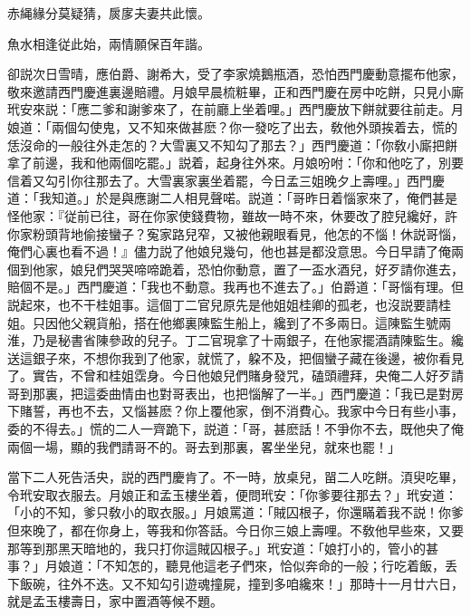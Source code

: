 \begin{myquote}
赤䋲緣分莫疑猜，扊扅夫妻共此懷。

魚水相逢従此始，兩情願保百年諧。
\end{myquote}

卻説次日雪晴，應伯爵、謝希大，受了李家燒鵝瓶酒，恐怕西門慶動意擺布他家，敬來邀請西門慶進裏邊賠禮。月娘早晨梳粧畢，正和西門慶在房中吃餅，只見小廝玳安來説：「應二爹和謝爹來了，在前廳上坐着哩。」西門慶放下餅就要往前走。月娘道：「兩個勾使鬼，又不知來做甚麽？你一發吃了出去，敎他外頭挨着去，慌的恁沒命的一般往外走怎的？大雪裏又不知勾了那去？」西門慶道：「你敎小廝把餅拿了前邊，我和他兩個吃罷。」説着，起身往外來。月娘吩咐：「你和他吃了，別要信着又勾引你往那去了。大雪裏家裏坐着罷，今日孟三姐晚夕上壽哩。」西門慶道：「我知道。」於是與應謝二人相見聲喏。説道：「哥昨日着惱家來了，俺們甚是怪他家：『従前已往，哥在你家使錢費物，雖故一時不來，休要改了腔兒纔好，許你家粉頭背地偷接蠻子？寃家路兒窄，又被他親眼看見，他怎的不惱！休説哥惱，俺們心裏也看不過！』儘力説了他娘兒幾句，他也甚是都没意思。今日早請了俺兩個到他家，娘兒們哭哭啼啼跪着，恐怕你動意，置了一盃水酒兒，好歹請你進去，賠個不是。」西門慶道：「我也不動意。我再也不進去了。」伯爵道：「哥惱有理。但説起來，也不干桂姐事。這個丁二官兒原先是他姐姐桂卿的孤老，也沒説要請桂姐。只因他父親貨船，搭在他鄉裏陳監生船上，纔到了不多兩日。這陳監生號兩淮，乃是秘書省陳參政的兒子。丁二官現拿了十兩銀子，在他家擺酒請陳監生。纔送這銀子來，不想你我到了他家，就慌了，躱不及，把個蠻子藏在後邊，被你看見了。實告，不曾和桂姐霑身。今日他娘兒們賭身發咒，磕頭禮拜，央俺二人好歹請哥到那裏，把這委曲情由也對哥表出，也把惱解了一半。」西門慶道：「我已是對房下賭誓，再也不去，又惱甚麽？你上覆他家，倒不消費心。我家中今日有些小事，委的不得去。」慌的二人一齊跪下，説道：「哥，甚麽話！不爭你不去，既他央了俺兩個一場，顯的我們請哥不的。哥去到那裏，畧坐坐兒，就來也罷！」

當下二人死告活央，説的西門慶肯了。不一時，放桌兒，㽞二人吃餅。湏臾吃畢，令玳安取衣服去。月娘正和孟玉樓坐着，便問玳安：「你爹要往那去？」玳安道：「小的不知，爹只敎小的取衣服。」月娘罵道：「賊囚根子，你還瞞着我不説！你爹但來晚了，都在你身上，等我和你答話。今日你三娘上壽哩。不敎他早些來，又要那等到那黑天暗地的，我只打你這賊囚根子。」玳安道：「娘打小的，管小的甚事？」月娘道：「不知怎的，聽見他這老子們來，恰似奔命的一般；行吃着飯，丢下飯碗，往外不迭。又不知勾引遊魂撞屍，撞到多咱纔來！」那時十一月廿六日，就是孟玉樓壽日，家中置酒等候不題。

